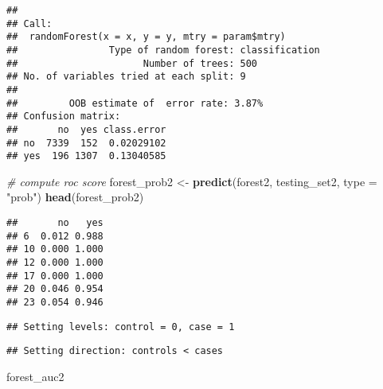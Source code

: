 \documentclass[
]{article}
\newenvironment{Shaded}{\begin{snugshade}}{\end{snugshade}}
\newcommand{\AttributeTok}[1]{\textcolor[rgb]{0.13,0.29,0.53}{#1}}
\newcommand{\CommentTok}[1]{\textcolor[rgb]{0.56,0.35,0.01}{\textit{#1}}}
\newcommand{\DecValTok}[1]{\textcolor[rgb]{0.00,0.00,0.81}{#1}}
\newcommand{\DocumentationTok}[1]{\textcolor[rgb]{0.56,0.35,0.01}{\textbf{\textit{#1}}}}
\newcommand{\FunctionTok}[1]{\textcolor[rgb]{0.13,0.29,0.53}{\textbf{#1}}}
\newcommand{\NormalTok}[1]{#1}
\newcommand{\OtherTok}[1]{\textcolor[rgb]{0.56,0.35,0.01}{#1}}
\newcommand{\SpecialCharTok}[1]{\textcolor[rgb]{0.81,0.36,0.00}{\textbf{#1}}}
\newcommand{\StringTok}[1]{\textcolor[rgb]{0.31,0.60,0.02}{#1}}
\begin{document}
\begin{Shaded}
\end{Shaded}

\begin{verbatim}
## 
## Call:
##  randomForest(x = x, y = y, mtry = param$mtry) 
##                Type of random forest: classification
##                      Number of trees: 500
## No. of variables tried at each split: 9
## 
##         OOB estimate of  error rate: 3.87%
## Confusion matrix:
##       no  yes class.error
## no  7339  152  0.02029102
## yes  196 1307  0.13040585
\end{verbatim}

\begin{Shaded}
\begin{Highlighting}[]
\CommentTok{\# compute roc score}
\NormalTok{forest\_prob2 }\OtherTok{\textless{}{-}} \FunctionTok{predict}\NormalTok{(forest2, testing\_set2, }\AttributeTok{type =} \StringTok{"prob"}\NormalTok{)}
\FunctionTok{head}\NormalTok{(forest\_prob2)}
\end{Highlighting}
\end{Shaded}

\begin{verbatim}
##       no   yes
## 6  0.012 0.988
## 10 0.000 1.000
## 12 0.000 1.000
## 17 0.000 1.000
## 20 0.046 0.954
## 23 0.054 0.946
\end{verbatim}

\begin{Shaded}
\end{Shaded}

\begin{verbatim}
## Setting levels: control = 0, case = 1
\end{verbatim}

\begin{verbatim}
## Setting direction: controls < cases
\end{verbatim}

\begin{Shaded}
\begin{Highlighting}[]
\NormalTok{forest\_auc2}
\end{Highlighting}
\end{Shaded}
\end{document}
